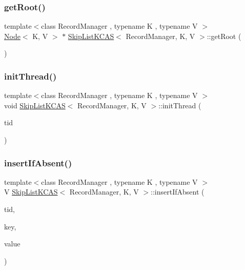\mbox{\label{classSkipListKCAS_aba9dcac668a65d8716c74298c0499218}} 
\subsubsection{\texorpdfstring{get\+Root()}{getRoot()}}
{\footnotesize\ttfamily template$<$class Record\+Manager , typename K , typename V $>$ \\
\hyperlink{classNode}{Node}$<$ K, V $>$ $\ast$ \hyperlink{classSkipListKCAS}{Skip\+List\+K\+C\+AS}$<$ Record\+Manager, K, V $>$\+::get\+Root (\begin{DoxyParamCaption}\item[{void}]{ }\end{DoxyParamCaption})}

\mbox{\label{classSkipListKCAS_a5794714ba69feac4dc63c3962a55c585}} 
\subsubsection{\texorpdfstring{init\+Thread()}{initThread()}}
{\footnotesize\ttfamily template$<$class Record\+Manager , typename K , typename V $>$ \\
void \hyperlink{classSkipListKCAS}{Skip\+List\+K\+C\+AS}$<$ Record\+Manager, K, V $>$\+::init\+Thread (\begin{DoxyParamCaption}\item[{const int}]{tid }\end{DoxyParamCaption})}

\mbox{\label{classSkipListKCAS_a31ac3cb003b2db554e9ff88709cf27b8}} 
\subsubsection{\texorpdfstring{insert\+If\+Absent()}{insertIfAbsent()}}
{\footnotesize\ttfamily template$<$class Record\+Manager , typename K , typename V $>$ \\
V \hyperlink{classSkipListKCAS}{Skip\+List\+K\+C\+AS}$<$ Record\+Manager, K, V $>$\+::insert\+If\+Absent (\begin{DoxyParamCaption}\item[{const int}]{tid,  }\item[{const K \&}]{key,  }\item[{const V \&}]{value }\end{DoxyParamCaption})\hspace{0.3cm}{\ttfamily [inline]}}

